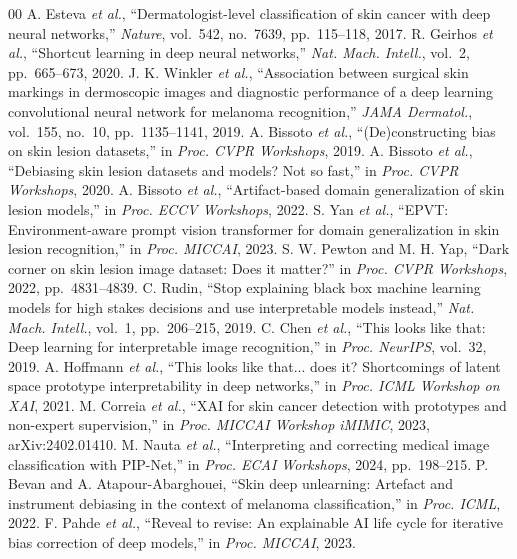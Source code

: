 \documentclass[conference]{IEEEtran}
\begin{document}
\begin{thebibliography}{00}
 A. Esteva \emph{et al.}, ``Dermatologist-level classification of skin cancer with deep neural networks,'' \emph{Nature}, vol.~542, no.~7639, pp.~115--118, 2017.
 R. Geirhos \emph{et al.}, ``Shortcut learning in deep neural networks,'' \emph{Nat. Mach. Intell.}, vol.~2, pp.~665--673, 2020.
 J. K. Winkler \emph{et al.}, ``Association between surgical skin markings in dermoscopic images and diagnostic performance of a deep learning convolutional neural network for melanoma recognition,'' \emph{JAMA Dermatol.}, vol.~155, no.~10, pp.~1135--1141, 2019.
 A. Bissoto \emph{et al.}, ``(De)constructing bias on skin lesion datasets,'' in \emph{Proc. CVPR Workshops}, 2019.
 A. Bissoto \emph{et al.}, ``Debiasing skin lesion datasets and models? Not so fast,'' in \emph{Proc. CVPR Workshops}, 2020.
 A. Bissoto \emph{et al.}, ``Artifact-based domain generalization of skin lesion models,'' in \emph{Proc. ECCV Workshops}, 2022.
 S. Yan \emph{et al.}, ``EPVT: Environment-aware prompt vision transformer for domain generalization in skin lesion recognition,'' in \emph{Proc. MICCAI}, 2023.
 S. W. Pewton and M. H. Yap, ``Dark corner on skin lesion image dataset: Does it matter?'' in \emph{Proc. CVPR Workshops}, 2022, pp.~4831--4839.
 C. Rudin, ``Stop explaining black box machine learning models for high stakes decisions and use interpretable models instead,'' \emph{Nat. Mach. Intell.}, vol.~1, pp.~206--215, 2019.
 C. Chen \emph{et al.}, ``This looks like that: Deep learning for interpretable image recognition,'' in \emph{Proc. NeurIPS}, vol.~32, 2019.
 A. Hoffmann \emph{et al.}, ``This looks like that... does it? Shortcomings of latent space prototype interpretability in deep networks,'' in \emph{Proc. ICML Workshop on XAI}, 2021.
 M. Correia \emph{et al.}, ``XAI for skin cancer detection with prototypes and non-expert supervision,'' in \emph{Proc. MICCAI Workshop iMIMIC}, 2023, arXiv:2402.01410.
 M. Nauta \emph{et al.}, ``Interpreting and correcting medical image classification with PIP-Net,'' in \emph{Proc. ECAI Workshops}, 2024, pp.~198--215.
 P. Bevan and A. Atapour-Abarghouei, ``Skin deep unlearning: Artefact and instrument debiasing in the context of melanoma classification,'' in \emph{Proc. ICML}, 2022.
 F. Pahde \emph{et al.}, ``Reveal to revise: An explainable AI life cycle for iterative bias correction of deep models,'' in \emph{Proc. MICCAI}, 2023.

\end{thebibliography}
\end{document}
